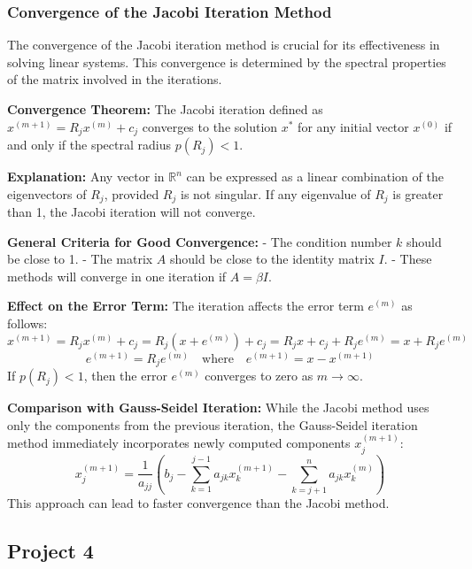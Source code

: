 \documentclass[unicode,11pt,a4paper,oneside,numbers=endperiod,openany]{scrartcl}
\begin{document}
\subsubsection{Convergence of the Jacobi Iteration Method}
The convergence of the Jacobi iteration method is crucial for its effectiveness in solving linear systems. This convergence is determined by the spectral properties of the matrix involved in the iterations.

\textbf{Convergence Theorem:}
The Jacobi iteration defined as \( x^{(m+1)} = R_j x^{(m)} + c_j \) converges to the solution \( x^* \) for any initial vector \( x^{(0)} \) if and only if the spectral radius \( p(R_j) < 1 \).

\textbf{Explanation:}
Any vector in \( \mathbb{R}^n \) can be expressed as a linear combination of the eigenvectors of \( R_j \), provided \( R_j \) is not singular. If any eigenvalue of \( R_j \) is greater than 1, the Jacobi iteration will not converge.

\textbf{General Criteria for Good Convergence:}
- The condition number \( k \) should be close to 1.
- The matrix \( A \) should be close to the identity matrix \( I \).
- These methods will converge in one iteration if \( A = \beta I \).

\textbf{Effect on the Error Term:}
The iteration affects the error term \( e^{(m)} \) as follows:
\[
 x^{(m+1)} = R_j x^{(m)} + c_j
 = R_j (x + e^{(m)}) + c_j
 = R_j x + c_j + R_j e^{(m)}
 = x + R_j e^{(m)}
\]
\[
 e^{(m+1)} = R_j e^{(m)} \quad \text{where} \quad e^{(m+1)} = x - x^{(m+1)}
\]
If \( p(R_j) < 1 \), then the error \( e^{(m)} \) converges to zero as \( m \rightarrow \infty \).

\textbf{Comparison with Gauss-Seidel Iteration:}
While the Jacobi method uses only the components from the previous iteration, the Gauss-Seidel iteration method immediately incorporates newly computed components \( x_j^{(m+1)} \):
\[
 x_j^{(m+1)} = \frac{1}{a_{jj}} \left( b_j - \sum_{k=1}^{j-1} a_{jk} x_k^{(m+1)} - \sum_{k=j+1}^n a_{jk} x_k^{(m)} \right)
\]
This approach can lead to faster convergence than the Jacobi method.

\subsection{Project 4}
\end{document}
